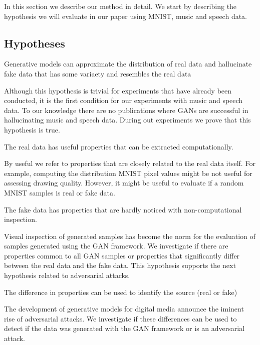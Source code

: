 In this section we describe our method in detail. We start by describing the
hypothesis we will evaluate in our paper using MNIST, music and speech data.
\subsection{Hypotheses}

\begin{hyp} \label{hyp:generate}
 Generative models can approximate the distribution of real data and hallucinate
 fake data that has some variaety and resembles the real data
\end{hyp}

Although this hypothesis is trivial for experiments that have already been
conducted, it is the first condition for our experiments with music and speech
data. To our knowledge there are no publications where GANs are successful
in hallucinating music and speech data. During out experiments we prove that
this hypothesis is true.

\begin{hyp} \label{hyp:features}
The real data has useful properties that can be extracted computationally.
\end{hyp}
By useful we refer to properties that are closely related to the real data
itself. For example, computing the distribution MNIST pixel values might be not
useful for assessing drawing quality. However, it might be useful to evaluate
if a random MNIST samples is real or fake data.

\begin{hyp} \label{hyp:visual}
The fake data has properties that are hardly noticed with non-computational inspection.
\end{hyp}
Visual inspection of generated samples has become the norm for the evaluation of
samples generated using the GAN framework. We investigate if there are
properties common to all GAN samples or properties that significantly differ
between the real data and the fake data. 
This hypothesis supports the next hypothesis related to adversarial attacks. 

\begin{hyp} \label{hyp:difference}
The difference in properties can be used to identify the source (real or fake)
\end{hyp}
The development of generative models for digital media announce the iminent
rise of adversarial attacks. We investigate if these differences can be used to
detect if the data was generated with the GAN framework or is an adversarial
attack.

